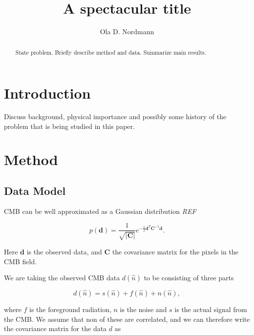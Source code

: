 \documentclass{emulateapj}
\begin{document}
\title{A spectacular title}

\author{Ola D. Nordmann}





\begin{abstract}
  State problem. Briefly describe method and data. Summarize main results.
\end{abstract}

\section{Introduction}
\label{sec:introduction}

Discuss background, physical importance and possibly some history of
the problem that is being studied in this paper.


\section{Method}
\label{sec:method}

\subsection{Data Model}
CMB can be well approximated as a Gaussian distribution \emph{REF}

\begin{equation}
p(\mathbf{d}) = \frac{1}{\sqrt{|\mathbf{C}|}}e^{-\frac{1}{2}\mathbf{d}^T \mathbf{C}^{-1}\mathbf{d}}.
 \end{equation} 

Here $\mathbf{d}$ is the observed data, and $\mathbf{C}$ the covariance matrix for the pixels in the CMB field.

We are taking the observed CMB data $d(\hat{n})$ to be consisting of three parts

\begin{equation}
d(\hat{n}) = s(\hat{n}) + f(\hat{n}) + n(\hat{n}),
\end{equation}

where $f$ is the foreground radiation, $n$ is the noise and $s$ is the actual signal from the CMB. We assume that non of these are correlated, and we can therefore write the covariance matrix for the data $d$ as 
\end{document}
